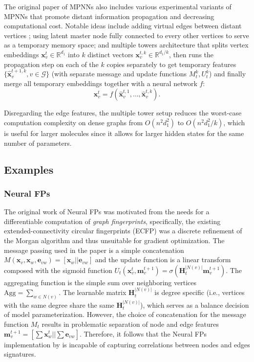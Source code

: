 The original paper of MPNNs also includes various experimental variants of
MPNNs that promote distant information propagation and decreasing computational
cost. Notable ideas include adding virtual edges between distant vertices
; using latent master node fully connected to every other vertices to serve as a
temporary memory space; and multiple towers architecture that splits vertex embeddings
$\mathbf{x}_{v}^t \in \mathbb{R}^{d_1}$ into $k$ distinct vectors
$\mathbf{x}_{v}^{t,k} \in \mathbb{R}^{d_1/k}$, then runs the propagation step on each of
the $k$ copies separately to get temporary features
$\{\hat{\mathbf{x}}_v^{t+1,k}, v \in \mathcal{G}\}$ (with separate message and
update functions $M_t^k, U_t^k$) and finally merge all temporary embeddings
together with a neural network $f$:
$$
  \mathbf{x}_{v}^t = f(\hat{\mathbf{x}}_v^{t,1}, \ldots, \hat{\mathbf{x}}_v^{t,k})
.$$

Disregarding the edge features, the multiple tower setup reduces the worst-case
computation complexity on dense graphs from $O(n^2d_1^2)$ to $O(n^2d_1^2/k)$, which is useful
for larger molecules since it allows for larger hidden states for the same number
of parameters.

\subsection{Examples}

\subsubsection{Neural FPs \citep{duvenaudConvolutionalNetworksGraphs2015}} The
original work of Neural FPs was motivated from the needs for a differentiable
computation of \textit{graph fingerprints}, specifically, the existing
extended-connectivity circular fingerprints (ECFP) \citep{rogersExtendedConnectivityFingerprints2010} was a discrete
refinement of the Morgan algorithm \citep{morganGenerationUniqueMachine2002} and thus unsuitable for gradient
optimization. The message passing used in the paper is a simple concatenation
$M(\mathbf{x}_v, \mathbf{x}_w, \mathbf{e}_{vw}) = [\mathbf{x}_w ||
\mathbf{e}_{vw}]$ and the update function is a linear transform composed with
the sigmoid function $U_t(\mathbf{x}_v^t, \mathbf{m}_v^{t+1}) =
\sigma(\mathbf{H}_t^{|N(v)|}\mathbf{m}_{v}^{t+1})$. The aggregating function is
the simple sum over neighboring vertices $\text{Agg} = \sum_{w \in N(v)}$. The
learnable matrix $\mathbf{H}_{t}^{|N(v)|}$ is degree specific (i.e., vertices
with the same degree share the same $\mathbf{H}_t^{|N(v)|}$), which serves as a
balance decision of model parameterization. However, the choice of concatenation
for the message function $M_t$ results in problematic separation of node and
edge features $\mathbf{m}_v^{t+1} = [\sum \mathbf{x}_w^t || \sum \mathbf{e}_{vw}]$.
Therefore, it follows that the Neural FPs implementation by
\citep{duvenaudConvolutionalNetworksGraphs2015} is incapable of capturing
correlations between nodes and edges signatures.

